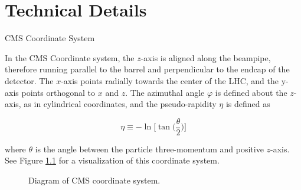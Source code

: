 \chapter{Technical Details}
\begin{section}{CMS Coordinate System}

In the CMS Coordinate system, the $z$-axis is aligned along the beampipe, therefore running parallel to the barrel and perpendicular to the endcap of the detector. The $x$-axis points radially towards the center of the LHC, and the y-axis points orthogonal to $x$ and $z$. The azimuthal angle $\varphi$ is defined about the $z$-axis, as in cylindrical coordinates, and the pseudo-rapidity $\eta$ is defined as

\begin{equation}
    \eta \equiv -\ln{\bigg[ \tan{\bigg( \frac{\theta}{2} \bigg)} \bigg]}
\end{equation}

\noindent where $\theta$ is the angle between the particle three-momentum and positive $z$-axis. See Figure \ref{fig:cms-coords} for a visualization of this coordinate system.

\begin{figure}[htb]
\begin{center}

\end{center}
\caption{Diagram of CMS coordinate system.}
\label{fig:cms-coords}
\end{figure}

\end{section}

